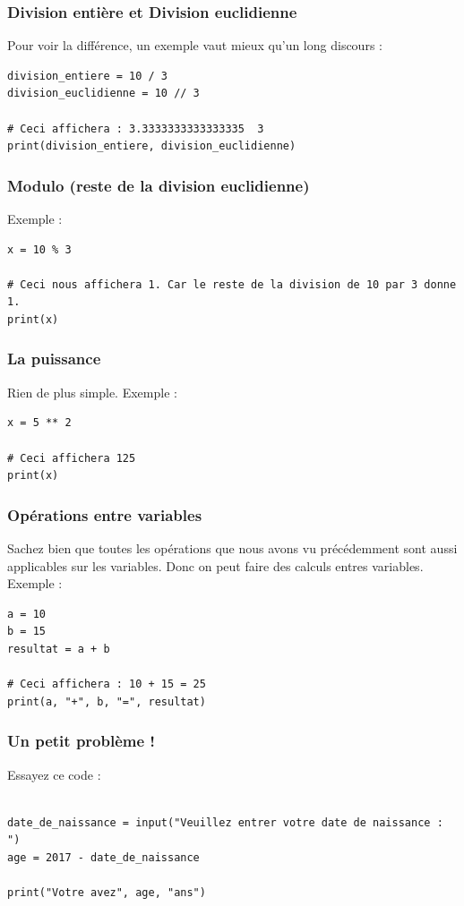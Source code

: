 \documentclass[12pt]{article}
\begin{document}
        \subsubsection{Division entière et Division euclidienne}
            Pour voir la différence, un exemple vaut mieux qu'un long discours :
            \begin{lstlisting}[style=code]
division_entiere = 10 / 3
division_euclidienne = 10 // 3

# Ceci affichera : 3.3333333333333335  3
print(division_entiere, division_euclidienne)
            \end{lstlisting}

        \subsubsection{Modulo (reste de la division euclidienne)}
            Exemple :
            \begin{lstlisting}[style=code, breaklines=false]
x = 10 % 3

# Ceci nous affichera 1. Car le reste de la division de 10 par 3 donne 1.
print(x) 
            \end{lstlisting}
        \subsubsection{La puissance}
            Rien de plus simple. Exemple :
            \begin{lstlisting}[style=code]
x = 5 ** 2

# Ceci affichera 125
print(x)
            \end{lstlisting}
        

        \subsubsection{Opérations entre variables}
            Sachez bien que toutes les opérations que nous avons vu précédemment sont aussi applicables sur les variables.
            Donc on peut faire des calculs entres variables. Exemple : 
            \begin{lstlisting}[style=code]
a = 10
b = 15
resultat = a + b

# Ceci affichera : 10 + 15 = 25
print(a, "+", b, "=", resultat)
            \end{lstlisting}

        \subsubsection{Un petit problème !}
            Essayez ce code : 
            \begin{lstlisting}[style=code, breaklines=false]

date_de_naissance = input("Veuillez entrer votre date de naissance : ")
age = 2017 - date_de_naissance

print("Votre avez", age, "ans")
            \end{lstlisting}
\end{document}
